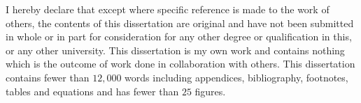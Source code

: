 
\begin{declaration}

I hereby declare that except where specific reference is made to the work of 
others, the contents of this dissertation are original and have not been 
submitted in whole or in part for consideration for any other degree or 
qualification in this, or any other university. This dissertation is my own 
work and contains nothing which is the outcome of work done in collaboration 
with others. This dissertation contains fewer than $12,000$ words including appendices, 
bibliography, footnotes, tables and equations and has fewer than $25$ figures.

\vspace{5em}



\end{declaration}

